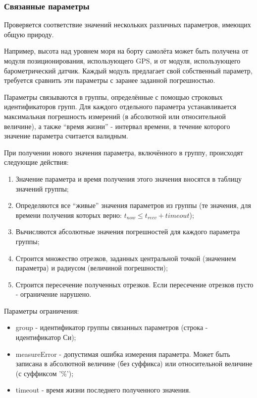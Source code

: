 \subsubsection{Связанные параметры}

Проверяется соответствие значений нескольких различных параметров, имеющих 
общую природу.

Например, высота над уровнем моря на борту самолёта может быть получена от 
модуля позиционирования, использующего GPS, и от модуля, использующего 
барометрический датчик. Каждый модуль предлагает свой собственный параметр, 
требуется сравнить эти параметры с заранее заданной погрешностью.

Параметры связываются в группы, определённые с помощью 
строковых идентификаторов групп. Для каждого отдельного 
параметра устанавливается максимальная погрешность измерений (в абсолютной или 
относительной величине), а также ``время жизни'' - интервал времени, в течение 
которого значение параметра считается валидным.

При получении нового значения параметра, включённого в группу, происходят 
следующие действия:

\begin{enumerate}
 \item Значение параметра и время получения этого значения вносятся в таблицу 
значений группы;
 \item Определяются все ``живые'' значения параметров из группы (те значения, 
для времени 
получения которых верно: $t_{now} \leq t_{recv} + timeout$);
 \item Вычисляются абсолютные значения погрешностей для каждого параметра 
группы;
 \item Строится множество отрезков, заданных центральной точкой (значением 
параметра) и радиусом (величиной погрешности);
 \item Строится пересечение полученных отрезков. Если пересечение отрезков 
пусто - ограничение нарушено.
\end{enumerate}

Параметры ограничения:
\begin{itemize}
 \item group - идентификатор группы связанных параметров (строка - 
идентификатор Си);
 \item measureError - допустимая ошибка измерения параметра. Может быть 
записана в абсолютной величине (без суффикса) или относительной величине (с 
суффиксом '\%');
 \item timeout - время жизни последнего полученного значения.
\end{itemize}

